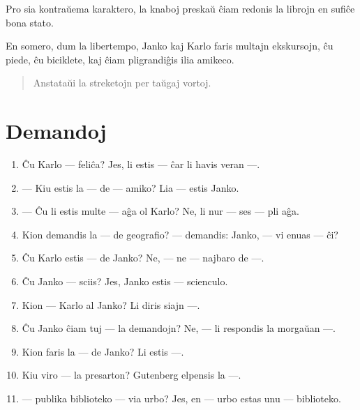 Pro sia kontraŭema karaktero, la knaboj preskaŭ ĉiam redonis la librojn en sufiĉe bona stato.

En somero, dum la libertempo, Janko kaj Karlo faris multajn ekskursojn, ĉu piede, ĉu biciklete, kaj ĉiam pligrandiĝis ilia amikeco.

\begin{quotation}
    \noindent Anstataŭi la streketojn per taŭgaj vortoj.
\end{quotation}

\newpage

\section*{Demandoj}

\begin{enumerate}
    \item  Ĉu Karlo — feliĉa? Jes, li estis — ĉar li havis veran —.
    \item  — Kiu estis la — de — amiko? Lia — estis Janko.
    \item  — Ĉu li estis multe — aĝa ol Karlo? Ne, li nur — ses — pli aĝa.
    \item  Kion demandis la — de geografio? — demandis: Janko, — vi enuas — ĉi?
    \item  Ĉu Karlo estis — de Janko? Ne, — ne — najbaro de —.
    \item  Ĉu Janko — sciis? Jes, Janko estis — scienculo.
    \item  Kion — Karlo al Janko? Li diris siajn —.
    \item  Ĉu Janko ĉiam tuj — la demandojn? Ne, — li respondis la morgaŭan —.
    \item  Kion faris la — de Janko? Li estis —.
    \item  Kiu viro — la presarton? Gutenberg elpensis la —.
    \item — publika biblioteko — via urbo? Jes, en — urbo estas unu — biblioteko.
\end{enumerate}
